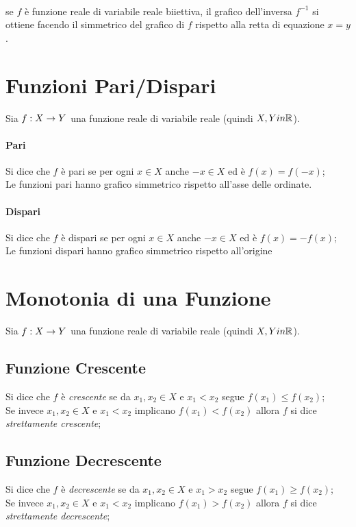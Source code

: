 \documentclass[12pt, a4paper, openany]{book}
\begin{document}
\paragraph*{} se $f$ è funzione reale di variabile reale biiettiva, il grafico dell'inversa $f^{-1}$ si ottiene facendo il simmetrico del grafico di $f$ rispetto alla retta di equazione $x=y$.

\section{Funzioni Pari/Dispari}
Sia $f: X \rightarrow Y$ una funzione reale di variabile reale (quindi $X, Y in \mathbb{R}$).
\paragraph*{Pari}
Si dice che $f$ è pari se per ogni $x \in X$ anche $-x \in X$ ed è $f(x) = f(-x)$;
\\Le funzioni pari hanno grafico simmetrico rispetto all'asse delle ordinate.
\paragraph*{Dispari}
Si dice che $f$ è dispari se per ogni $x \in X$ anche $-x \in X$ ed è $f(x) = -f(x)$;
\\Le funzioni dispari hanno grafico simmetrico rispetto all'origine

\section{Monotonia di una Funzione}
Sia $f: X \rightarrow Y$ una funzione reale di variabile reale (quindi $X, Y in \mathbb{R}$).

\subsection{Funzione Crescente}
Si dice che $f$ è \emph{crescente} se da $x_1, x_2 \in X$ e $x_1 < x_2$ segue $f(x_1) \leq f(x_2)$;
\\Se invece $x_1, x_2 \in X$ e $x_1 < x_2$ implicano $f(x_1) < f(x_2)$ allora $f$ si dice \emph{strettamente crescente};

\subsection{Funzione Decrescente}
Si dice che $f$ è \emph{decrescente} se da $x_1, x_2 \in X$ e $x_1 > x_2$ segue $f(x_1) \geq f(x_2)$;
\\Se invece $x_1, x_2 \in X$ e $x_1 < x_2$ implicano $f(x_1) > f(x_2)$ allora $f$ si dice \emph{strettamente decrescente};
\end{document}
